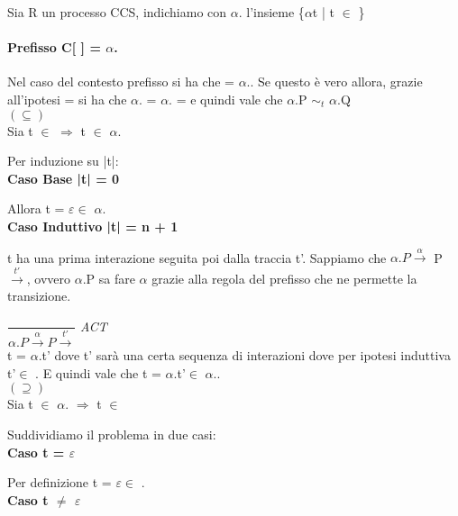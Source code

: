 Sia R un processo CCS, indichiamo con $\alpha$. l'insieme \{$\alpha$t | t $\in$ \}

\paragraph{Prefisso C[ ] = $\alpha$.} \mbox{}

Nel caso del contesto prefisso si ha che  = $\alpha$..
Se questo è vero allora, grazie all'ipotesi  =  si ha che  $\alpha$. =  $\alpha$. =  e quindi vale che $\alpha$.P $\sim_{t}$ $\alpha$.Q\\

$(\subseteq)$ \\

Sia  t $\in$  $\Rightarrow$  t $\in$ $\alpha$.

Per induzione su |t|:
\\

\textbf{Caso Base |t| = 0}

Allora t = $\varepsilon \in$ $ \alpha$.
\\

\textbf{Caso Induttivo |t| = n + 1}

t ha una prima interazione seguita poi dalla traccia t'. Sappiamo che $\alpha.P\overset{\alpha}\rightarrow $ P $\overset{t'}\rightarrow$, ovvero $\alpha$.P sa fare $\alpha$ grazie alla regola del prefisso che ne permette la transizione.

	$\dfrac{}{\alpha.P \overset{\alpha}\rightarrow P\overset{t'}\rightarrow}$ \textit{ACT} \\
	
t = $\alpha$.t' dove t' sarà una certa sequenza di interazioni dove per ipotesi induttiva t'$\in$ . E quindi vale che t = $\alpha$.t'$\in$ $\alpha$..\\

$(\supseteq)$ \\

Sia  t $\in$ $\alpha$. $\Rightarrow$  t $\in$ 

Suddividiamo il problema in due casi:
\\

\textbf{Caso t = $\varepsilon$}

Per definizione t = $\varepsilon \in $ .
\\
 
\textbf{Caso t $\not=$ $\varepsilon$}

